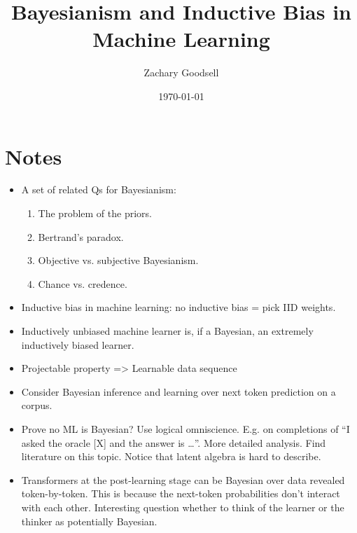 \documentclass[11pt]{article}
\title{Bayesianism and Inductive Bias in Machine Learning}
\author{Zachary Goodsell}
\date{\today}
\begin{document}
\maketitle

\section{Notes}

\begin{itemize}
    \item A set of related Qs for Bayesianism:
    \begin{enumerate}
        \item The problem of the priors.
        \item Bertrand's paradox.
        \item Objective vs. subjective Bayesianism.
        \item Chance vs. credence.
    \end{enumerate}
    \item Inductive bias in machine learning: no inductive bias = pick IID weights.
    \item Inductively unbiased machine learner is, if a Bayesian, an extremely inductively biased learner.
    \item Projectable property => Learnable data sequence
    \item Consider Bayesian inference and learning over next token prediction on a corpus.
    \item Prove no ML is Bayesian? Use logical omniscience. E.g. on completions of ``I asked the oracle [X] and the answer is \dots''. More detailed analysis. Find literature on this topic. Notice that latent algebra is hard to describe.
    \item Transformers at the post-learning stage can be Bayesian over data revealed token-by-token. This is because the next-token probabilities don't interact with each other. Interesting question whether to think of the learner or the thinker as potentially Bayesian.
\end{itemize}
\end{document}
